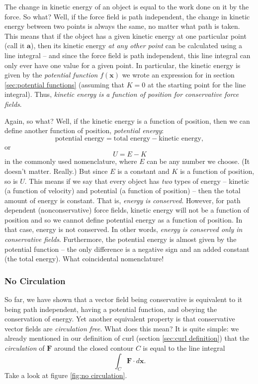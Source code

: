 \documentclass{myarticle}
\renewcommand{\vec}[1]{\mathbf{#1}}
\theoremstyle{nospace}
\newtheorem{old series theorem}{Theorem}
\newenvironment{series theorem}
{\begin{mdframed}\begin{old series theorem}}
    {\end{old series theorem}\end{mdframed}}
\begin{document}
The change in kinetic energy of an object is equal to the work done on
it by the force. So what? Well, if the force field is path
independent, the change in kinetic energy between two points is always
the same, no matter what path is taken. This means that if the object
has a given kinetic energy at one particular point (call it
$\vec{a}$), then its kinetic energy \textit{at any other point} can be
calculated using a line integral -- and since the force field is path
independent, this line integral can only ever have one value for a
given point. In particular, the kinetic energy is given by the
\textit{potential function} $f(\vec{x})$ we wrote an expression for in
section \ref{sec:potential functions} (assuming that $K = 0$ at the
starting point for the line integral). Thus, \textit{kinetic energy is
  a function of position for conservative force fields}.

Again, so what? Well, if the kinetic energy is a function of position,
then we can define another function of position, \textit{potential
  energy}:
\[
  \text{potential energy}
  = \text{total energy} - \text{kinetic energy},
\]
or
\[
  U = E - K
\]
in the commonly used nomenclature, where $E$ can be any number we
choose. (It doesn't matter. Really.) But since $E$ is a constant and
$K$ is a function of position, so is $U$. This means if we say that
every object has \textit{two} types of energy -- kinetic (a function
of velocity) and potential (a function of position) -- then the total
amount of energy is constant. That is, \textit{energy is conserved}.
However, for path dependent (nonconservative) force fields, kinetic
energy will not be a function of position and so we cannot define
potential energy as a function of position. In that case, energy is
not conserved. In other words, \textit{energy is conserved only in
  conservative fields}. Furthermore, the potential energy is almost
given by the potential function -- the only difference is a negative
sign and an added constant (the total energy). What coincidental
nomenclature!

\subsubsection{No Circulation}
\label{sec:no circulation}

So far, we have shown that a vector field being conservative is
equivalent to it being path independent, having a potential function,
and obeying the conservation of energy. Yet another equivalent
property is that conservative vector fields are \textit{circulation
  free}. What does this mean? It is quite simple: we already mentioned
in our definition of curl (section \ref{sec:curl definition}) that the
\textit{circulation} of $\vec{F}$ around the closed contour $C$ is
equal to the line integral
\[
  \int_C \vec{F} \cdot d\vec{x}.
\]
Take a look at figure \ref{fig:no circulation}.
\end{document}
